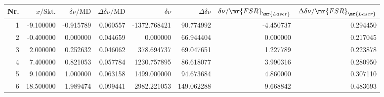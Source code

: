 \begin{tabular}{rrrrrrrr}
\toprule
Nr. & $x/\mathrm{Skt.}$ & $\delta\nu/\mathrm{MD}$ & $\Delta\delta\nu/\mathrm{MD}$ & $\delta\nu$ & $\Delta\delta\nu$ & $\delta\nu/\mr{FSR}_\mr{Laser}$ & $\Delta\delta\nu/\mr{FSR}_\mr{Laser}$ \\
\midrule
1 & -9.100000 & -0.915789 & 0.060557 & -1372.768421 & 90.774992 & -4.450737 & 0.294450 \\
2 & -0.400000 & 0.000000 & 0.044659 & 0.000000 & 66.944404 & 0.000000 & 0.217045 \\
3 & 2.000000 & 0.252632 & 0.046062 & 378.694737 & 69.047651 & 1.227789 & 0.223878 \\
4 & 7.400000 & 0.821053 & 0.057784 & 1230.757895 & 86.618077 & 3.990316 & 0.280950 \\
5 & 9.100000 & 1.000000 & 0.063158 & 1499.000000 & 94.673684 & 4.860000 & 0.307110 \\
6 & 18.500000 & 1.989474 & 0.099441 & 2982.221053 & 149.062288 & 9.668842 & 0.483693 \\
\bottomrule
\end{tabular}
